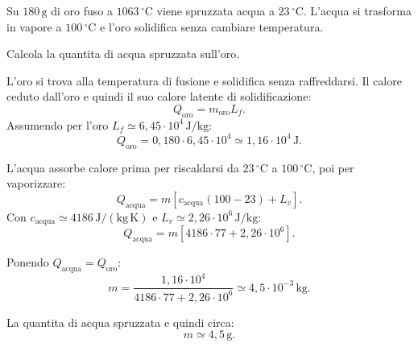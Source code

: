 
\begin{esercizio}
Su \(180\,\mathrm{g}\) di oro fuso a \(1063\,^\circ\mathrm{C}\) viene
spruzzata acqua a \(23\,^\circ\mathrm{C}\). L'acqua si trasforma in vapore a
\(100\,^\circ\mathrm{C}\) e l'oro solidifica senza cambiare temperatura.

Calcola la quantita di acqua spruzzata sull'oro.
\end{esercizio}

\begin{soluzione}
L'oro si trova alla temperatura di fusione e solidifica senza raffreddarsi.
Il calore ceduto dall'oro e quindi il suo calore latente di solidificazione:
\[
Q_\text{oro}=m_\text{oro}L_f.
\]
Assumendo per l'oro \(L_f\simeq 6{,}45\cdot 10^4\,\mathrm{J/kg}\):
\[
Q_\text{oro}=0{,}180\cdot 6{,}45\cdot 10^4
\simeq 1{,}16\cdot 10^4\,\mathrm{J}.
\]

L'acqua assorbe calore prima per riscaldarsi da
\(23\,^\circ\mathrm{C}\) a \(100\,^\circ\mathrm{C}\), poi per vaporizzare:
\[
Q_\text{acqua}=m\left[c_\text{acqua}(100-23)+L_v\right].
\]
Con \(c_\text{acqua}\simeq 4186\,\mathrm{J/(kg\,K)}\) e
\(L_v\simeq 2{,}26\cdot 10^6\,\mathrm{J/kg}\):
\[
Q_\text{acqua}=m\left[4186\cdot 77+2{,}26\cdot 10^6\right].
\]

Ponendo \(Q_\text{acqua}=Q_\text{oro}\):
\[
m=\frac{1{,}16\cdot 10^4}{4186\cdot 77+2{,}26\cdot 10^6}
\simeq 4{,}5\cdot 10^{-3}\,\mathrm{kg}.
\]

La quantita di acqua spruzzata e quindi circa:
\[
m\simeq 4{,}5\,\mathrm{g}.
\]
\end{soluzione}
